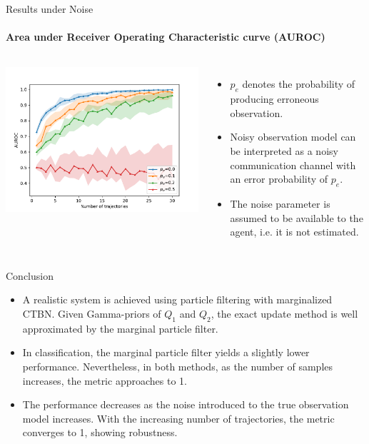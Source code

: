 \documentclass[
english,%
aspectratio=169,%
color={accentcolor=3b},
logo=true,%
colorframetitle=false,%
]{tudabeamer}
\begin{document}
\begin{frame}{Results under Noise}
\framesubtitle{Area under Receiver Operating Characteristic curve (AUROC)}
\begin{columns}[onlytextwidth,c]
\centering
\includegraphics[width=\linewidth]{figures/error_AUROC_perc_0}
\begin{itemize}
\item $ p_e $ denotes the probability of producing erroneous observation.
\item Noisy observation model can be interpreted as a noisy communication channel with an error probability of $ p_e $.
\item The noise parameter is assumed to be available to the agent, i.e. it is not estimated.
\end{itemize}
\end{columns}
\end{frame}


\begin{frame}{Conclusion}
\begin{itemize}
\item A realistic system is achieved using particle filtering with marginalized CTBN. Given Gamma-priors of $ Q_1 $ and $ Q_2 $, the exact update method is well approximated by the marginal particle filter.
\item In classification, the marginal particle filter yields a slightly lower performance. Nevertheless, in both methods, as the number of samples increases, the metric approaches to 1.
\item The performance decreases as the noise introduced to the true observation model increases. With the increasing number of trajectories, the metric converges to 1, showing robustness.
\end{itemize}
\end{frame}
\end{document}
